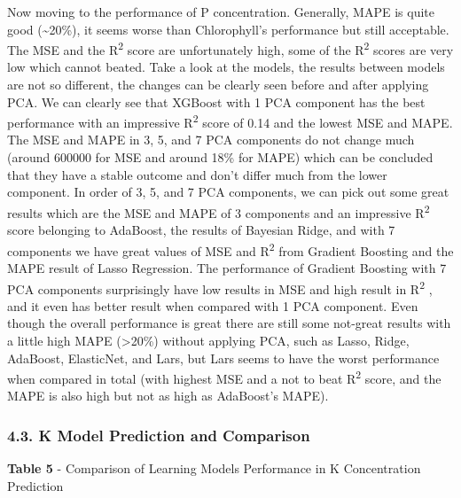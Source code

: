 \documentclass[
]{article}
\begin{document}
Now moving to the performance of P concentration. Generally, MAPE is
quite good (\textasciitilde20\%), it seems worse than Chlorophyll's
performance but still acceptable. The MSE and the R\textsuperscript{2}
score are unfortunately high, some of the R\textsuperscript{2} scores
are very low which cannot beated. Take a look at the models, the results
between models are not so different, the changes can be clearly seen
before and after applying PCA. We can clearly see that XGBoost with 1
PCA component has the best performance with an impressive
R\textsuperscript{2} score of 0.14 and the lowest MSE and MAPE. The MSE
and MAPE in 3, 5, and 7 PCA components do not change much (around 600000
for MSE and around 18\% for MAPE) which can be concluded that they have
a stable outcome and don't differ much from the lower component. In
order of 3, 5, and 7 PCA components, we can pick out some great results
which are the MSE and MAPE of 3 components and an impressive
R\textsuperscript{2} score belonging to AdaBoost, the results of
Bayesian Ridge, and with 7 components we have great values of MSE and
R\textsuperscript{2} from Gradient Boosting and the MAPE result of Lasso
Regression. The performance of Gradient Boosting with 7 PCA components
surprisingly have low results in MSE and high result in
R\textsuperscript{2} , and it even has better result when compared with
1 PCA component. Even though the overall performance is great there are
still some not-great results with a little high MAPE (\textgreater20\%)
without applying PCA, such as Lasso, Ridge, AdaBoost, ElasticNet, and
Lars, but Lars seems to have the worst performance when compared in
total (with highest MSE and a not to beat R\textsuperscript{2} score,
and the MAPE is also high but not as high as AdaBoost's MAPE).

\hypertarget{k-model-prediction-and-comparison}{%
\subsubsection{\texorpdfstring{\textbf{4.3. K Model Prediction and
Comparison}}{4.3. K Model Prediction and Comparison}}\label{k-model-prediction-and-comparison}}

\textbf{Table 5} - Comparison of Learning Models Performance in K
Concentration Prediction
\end{document}
